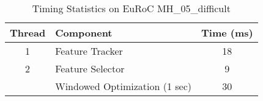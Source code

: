 \begin{table}[h]
\centering
\caption{Timing Statistics on EuRoC MH\_05\_difficult}
\begin{tabular}{clc}
    \toprule
    Thread & Component & Time (ms) \\
    \midrule
    1 & Feature Tracker & 18 \\
    \midrule
    2 & Feature Selector & 9 \\
      & Windowed Optimization (1 sec) & 30 \\
    \bottomrule
\end{tabular}
\label{tab:timing}
\end{table}